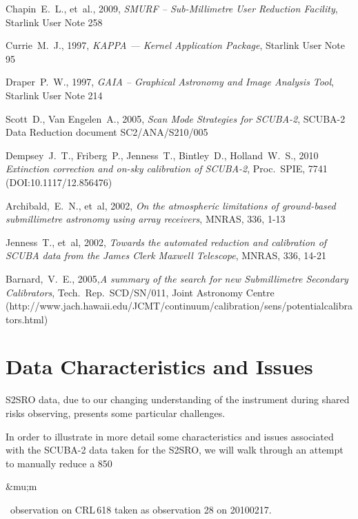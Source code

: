 \documentclass[twoside,11pt]{article}
\newcommand{\micron}{\mbox{\,${\umu}$m}}            %
\newcommand{\htmladdnormallink}[2]{#1}
\newcommand{\xref}[3]{#1}
\newcommand{\xlabel}[1]{}
\renewcommand{\_}{\texttt{\symbol{95}}}
\renewcommand{\micron}{\begin{rawhtml}&mu;m\end{rawhtml}}
\begin{document}
\begin{thebibliography}{}

Chapin~E.~L., et~al., 2009, \textit{SMURF -- Sub-Millimetre User Reduction
Facility},
\xref{Starlink User Note 258}{sun258}{}

Currie~M.~J., 1997, \textit{KAPPA --- Kernel Application Package},
\xref{Starlink User Note 95}{sun95}{}

Draper~P.~W., 1997, \textit{GAIA -- Graphical Astronomy and Image
Analysis Tool},
\xref{Starlink User Note 214}{sun214}{}

Scott~D., Van Engelen~A., 2005, \textit{Scan Mode Strategies for
  SCUBA-2}, SCUBA-2 Data Reduction document SC2/ANA/S210/005

Dempsey~J.~T., Friberg~P., Jenness~T., Bintley~D., Holland~W.~S., 2010
\textit{Extinction correction and on-sky calibration of SCUBA-2},
Proc.\ SPIE, 7741 (DOI:10.1117/12.856476)

Archibald,~E.~N., et~al, 2002, \textit{On the atmospheric limitations of ground-based submillimetre astronomy using array receivers},
MNRAS, 336, 1-13

Jenness~T., et~al, 2002, \textit{Towards the automated reduction and calibration of SCUBA data from the James Clerk Maxwell Telescope},
MNRAS, 336, 14-21

Barnard,~V.~E., 2005,\textit{A summary of the search for new Submillimetre Secondary Calibrators},
Tech.\ Rep.\ SCD/SN/011, Joint Astronomy Centre
(\htmladdnormallink{http://www.jach.hawaii.edu/JCMT/continuum/calibration/sens/potentialcalibrators.html}{http://www.jach.hawaii.edu/JCMT/continuum/calibration/sens/potentialcalibrators.html})

\end{thebibliography}

\newpage
\appendix

\section{\xlabel{Dataissues}Data Characteristics and Issues}
\label{sec:Issues}

S2SRO data, due to our changing understanding of the instrument during
shared risks observing, presents some particular challenges.

In order to illustrate in more detail some characteristics and issues
associated with the SCUBA-2 data taken for the S2SRO, we will walk
through an attempt to manually reduce a 850\micron\ observation on
CRL\,618 taken as observation 28 on 20100217.
\end{document}
